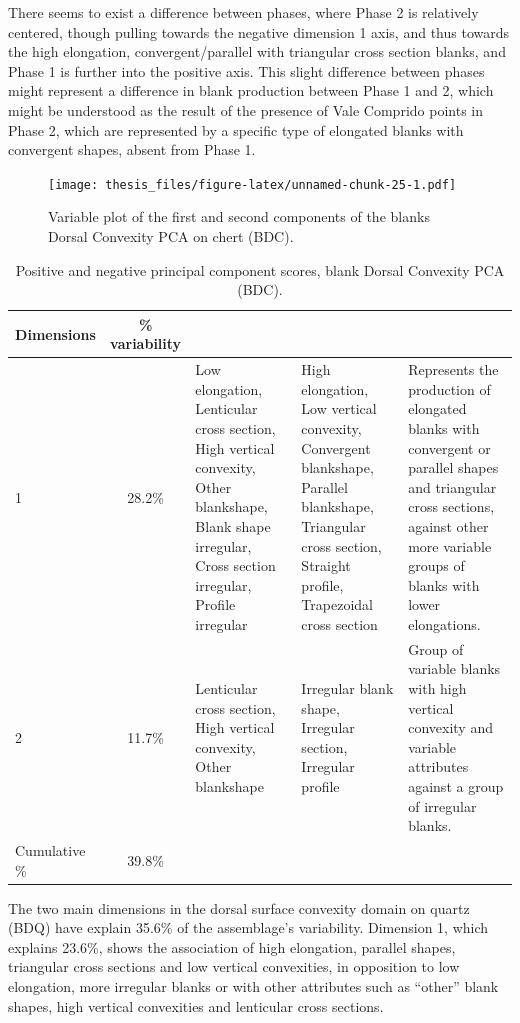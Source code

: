 \documentclass[12pt,twoside]{reedthesis}
\begin{document}
There seems to exist a difference between phases, where Phase 2 is relatively centered, though pulling towards the negative dimension 1 axis, and thus towards the high elongation, convergent/parallel with triangular cross section blanks, and Phase 1 is further into the positive axis. This slight difference between phases might represent a difference in blank production between Phase 1 and 2, which might be understood as the result of the presence of Vale Comprido points in Phase 2, which are represented by a specific type of elongated blanks with convergent shapes, absent from Phase 1.
\begin{figure}
\centering
\texttt{[image: thesis\_files/figure-latex/unnamed-chunk-25-1.pdf]}
\caption{\label{fig:unnamed-chunk-25}Variable plot of the first and second components of the blanks Dorsal Convexity PCA on chert (BDC).}
\end{figure}
\begin{table}[!h]

\caption{\label{tab:unnamed-chunk-26}Positive and negative principal component scores, blank Dorsal Convexity PCA (BDC).}
\centering
\begin{tabular}[t]{lc>{\raggedright\arraybackslash}p{3cm}>{\raggedright\arraybackslash}p{3cm}>{\raggedright\arraybackslash}p{3cm}}
\toprule
\multicolumn{1}{c}{\textbf{Dimensions}} & \multicolumn{1}{c}{\textbf{\% variability}} & \multicolumn{1}{>{\centering\arraybackslash}p{3cm}}{\textbf{+}} & \multicolumn{1}{>{\centering\arraybackslash}p{3cm}}{\textbf{-}} & \multicolumn{1}{>{\centering\arraybackslash}p{3cm}}{\textbf{Interpretation}}\\
\midrule
1 & 28.2\% & Low elongation, Lenticular cross section, High vertical convexity, Other blankshape,
                              Blank shape irregular, Cross section irregular, Profile irregular & High elongation, Low vertical convexity, Convergent blankshape, Parallel blankshape, Triangular cross section,
                               Straight profile, Trapezoidal cross section & Represents the production of elongated blanks with convergent or parallel shapes and triangular cross sections,
                               against other more variable groups of blanks with lower elongations.\\
2 & 11.7\% & Lenticular cross section, High vertical convexity, Other blankshape & Irregular blank shape, Irregular section, Irregular profile & Group of variable blanks with high vertical convexity and variable attributes against a group of irregular blanks.\\
Cumulative \% & 39.8\% &  &  & \\
\bottomrule
\end{tabular}
\end{table}
The two main dimensions in the dorsal surface convexity domain on quartz (BDQ) have explain 35.6\% of the assemblage's variability.
Dimension 1, which explains 23.6\%, shows the association of high elongation, parallel shapes, triangular cross sections and low vertical convexities, in opposition to low elongation, more irregular blanks or with other attributes such as ``other'' blank shapes, high vertical convexities and lenticular cross sections.
\end{document}
